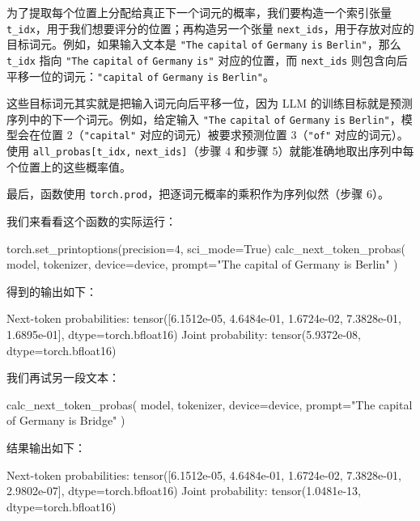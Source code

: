 为了提取每个位置上分配给真正下一个词元的概率，我们要构造一个索引张量 \texttt{t\_idx}，用于我们想要评分的位置；再构造另一个张量 \texttt{next\_ids}，用于存放对应的目标词元。例如，如果输入文本是 \texttt{"}\texttt{The} \texttt{capital} \texttt{of} \texttt{Germany} \texttt{is} \texttt{Berlin}\texttt{"}，那么 \texttt{t\_idx} 指向 \texttt{"}\texttt{The} \texttt{capital} \texttt{of} \texttt{Germany} \texttt{is}\texttt{"} 对应的位置，而 \texttt{next\_ids} 则包含向后平移一位的词元：\texttt{"}\texttt{capital} \texttt{of} \texttt{Germany} \texttt{is} \texttt{Berlin}\texttt{"}。

这些目标词元其实就是把输入词元向后平移一位，因为 LLM 的训练目标就是预测序列中的下一个词元。例如，给定输入 \texttt{"}\texttt{The} \texttt{capital} \texttt{of} \texttt{Germany} \texttt{is} \texttt{Berlin}\texttt{"}，模型会在位置 2（\texttt{"}\texttt{capital}\texttt{"} 对应的词元）被要求预测位置 3（\texttt{"}\texttt{of}\texttt{"} 对应的词元）。使用 \texttt{all\_probas[t\_idx,} \texttt{next\_ids]}（步骤 4 和步骤 5）就能准确地取出序列中每个位置上的这些概率值。

最后，函数使用 \texttt{torch.prod}，把逐词元概率的乘积作为序列似然（步骤 6）。

我们来看看这个函数的实际运行：

\begin{codebox}
torch.set_printoptions(precision=4, sci_mode=True)
calc_next_token_probas(
        model, tokenizer, device=device,
        prompt="The capital of Germany is Berlin"
    )
\end{codebox}

得到的输出如下：

\begin{codebox}
Next-token probabilities: tensor([6.1512e-05, 4.6484e-01,
1.6724e-02, 7.3828e-01, 1.6895e-01], dtype=torch.bfloat16)
Joint probability: tensor(5.9372e-08, dtype=torch.bfloat16)
\end{codebox}

我们再试另一段文本：

\begin{codebox}
calc_next_token_probas(
        model, tokenizer, device=device,
        prompt="The capital of Germany is Bridge"
    )
\end{codebox}

结果输出如下：

\begin{codebox}
Next-token probabilities: tensor([6.1512e-05, 4.6484e-01, 1.6724e-02,
7.3828e-01, 2.9802e-07], dtype=torch.bfloat16)
Joint probability: tensor(1.0481e-13, dtype=torch.bfloat16)
\end{codebox}

